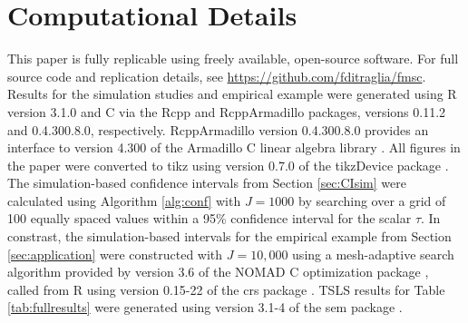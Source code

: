 \section{Computational Details}
\label{append:comp}
This paper is fully replicable using freely available, open-source software.
For full source code and replication details, see \url{https://github.com/fditraglia/fmsc}.
Results for the simulation studies and empirical example were generated using R version 3.1.0 \citep{R} and C\raisebox{0.5ex}{\tiny\textbf{++}} via the Rcpp \citep{RcppArticle,RcppBook} and RcppArmadillo \citep{RcppArmadillo} packages, versions 0.11.2 and 0.4.300.8.0, respectively.
RcppArmadillo version 0.4.300.8.0 provides an interface to version 4.300 of the Armadillo C\raisebox{0.5ex}{\tiny\textbf{++}} linear algebra library \citep{Armadillo}.
All figures in the paper were converted to tikz using version 0.7.0 of the tikzDevice package \citep{tikzDevice}.
The simulation-based confidence intervals from Section \ref{sec:CIsim} were calculated using Algorithm \ref{alg:conf} with $J = 1000$ by searching over a grid of 100 equally spaced values within a 95\% confidence interval for the scalar $\tau$.
In constrast, the simulation-based intervals for the empirical example from Section \ref{sec:application} were constructed with $J = 10,000$ using a mesh-adaptive search algorithm provided by version 3.6 of the NOMAD C\raisebox{0.5ex}{\tiny\textbf{++}} optimization package \citep{NOMADalgorithm,NOMADcode,NOMADuserguide}, called from R using version 0.15-22 of the crs package \citep{crs}.
TSLS results for Table \ref{tab:fullresults} were generated using version 3.1-4 of the sem package \citep{sem}.